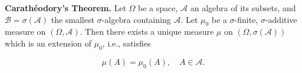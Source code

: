 \textbf{Carath\'{e}odory's Theorem.} Let $\Omega$ be a space, $\mathcal{A}$ an algebra of its subsets, and $\mathcal{B} = \sigma(\mathcal{A})$ the smallest $\sigma$-algebra containing $\mathcal{A}$. Let $\mu_0$ be a $\sigma$-finite, $\sigma$-additive measure on $(\Omega, \mathcal{A})$. Then there exists a unique measure $\mu$ on $(\Omega, \sigma(\mathcal{A}))$ which is an extension of $\mu_0$, i.e., satisfies

$$\mu(A) = \mu_0(A), \quad A \in \mathcal{A}.$$
